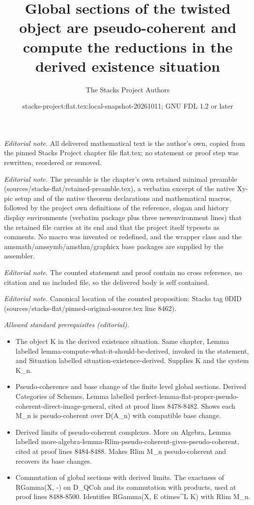 \documentclass[10pt,a4paper]{amsart}
\title{Global sections of the twisted object are pseudo-coherent and compute the reductions in the derived existence situation}
\author{The Stacks Project Authors}
\date{stacks-project:flat.tex:local-snapshot-20261011; GNU FDL 1.2 or later}
\theoremstyle{plain}
\theoremstyle{definition}
\theoremstyle{remark}
\numberwithin{equation}{subsection}
\begin{document}
\maketitle
\noindent\textit{Editorial note.} All delivered mathematical text is the author's own, copied from the pinned Stacks Project chapter file flat.tex; no statement or proof step was rewritten, reordered or removed.\par\medskip
\noindent\textit{Editorial note.} The preamble is the chapter's own retained minimal preamble (sources/stacks-flat/retained-preamble.tex), a verbatim excerpt of the native Xy-pic setup and of the native theorem declarations and mathematical macros, followed by the project own definitions of the reference, slogan and history display environments (verbatim package plus three newenvironment lines) that the retained file carries at its end and that the project itself typesets as comments. No macro was invented or redefined, and the wrapper class and the amsmath/amssymb/amsthm/graphicx base packages are supplied by the assembler.\par\medskip
\noindent\textit{Editorial note.} The counted statement and proof contain no cross reference, no citation and no included file, so the delivered body is self contained.\par\medskip
\noindent\textit{Editorial note.} Canonical location of the counted proposition: Stacks tag 0DID (sources/stacks-flat/pinned-original-source.tex line 8462).\par\medskip
\noindent\textit{Allowed standard prerequisites (editorial).}\begin{itemize}
\item The object K in the derived existence situation. Same chapter, Lemma labelled lemma-compute-what-it-should-be-derived, invoked in the statement, and Situation labelled situation-existence-derived. Supplies K and the system K\_n.
\item Pseudo-coherence and base change of the finite level global sections. Derived Categories of Schemes, Lemma labelled perfect-lemma-flat-proper-pseudo-coherent-direct-image-general, cited at proof lines 8478-8482. Shows each M\_n is pseudo-coherent over D(A\_n) with compatible base change.
\item Derived limits of pseudo-coherent complexes. More on Algebra, Lemma labelled more-algebra-lemma-Rlim-pseudo-coherent-gives-pseudo-coherent, cited at proof lines 8484-8488. Makes Rlim M\_n pseudo-coherent and recovers its base changes.
\item Commutation of global sections with derived limits. The exactness of RGamma(X, -) on D\_QCoh and its commutation with products, used at proof lines 8488-8500. Identifies RGamma(X, E otimes\textasciicircum{}L K) with Rlim M\_n.
\end{itemize}\medskip
\end{document}
